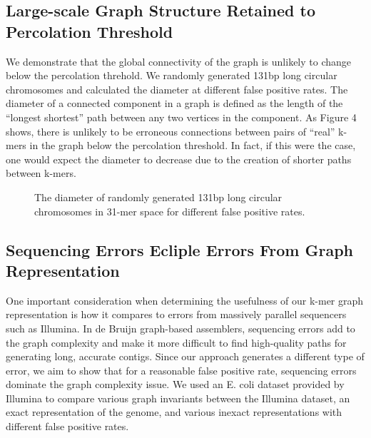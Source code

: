 \documentclass[12pt]{article} \usepackage{simplemargins}
\begin{document}
\subsection{Large-scale Graph Structure Retained to Percolation Threshold}
We demonstrate that the global connectivity of the graph is unlikely 
to change below the percolation threhold. We randomly generated 131bp long circular 
chromosomes and calculated the diameter at different false positive rates. The diameter 
of a connected component in a graph is defined as the length of the ``longest shortest'' 
path between any two vertices in the component. As Figure 4 shows, there is unlikely to 
be erroneous connections between pairs of ``real'' k-mers in the graph below the 
percolation threshold. In fact, if this were the case, one would expect the diameter 
to decrease due to the creation of shorter paths between k-mers.

\begin{figure}
\caption{The diameter of randomly generated 131bp long circular chromosomes in 31-mer 
space for different false positive rates.}
\end{figure}

\subsection{Sequencing Errors Ecliple Errors From Graph Representation}
One important consideration when determining the usefulness of our k-mer
graph representation is how it compares to errors from massively
parallel sequencers such as Illumina. In de Bruijn graph-based
assemblers, sequencing errors add to the graph complexity and make it
more difficult to find high-quality paths for generating long,
accurate contigs. Since our approach generates
a different type of error, we aim to show that for a reasonable false
positive rate, sequencing errors dominate the graph complexity
issue. We used an E. coli dataset provided by Illumina to compare
various graph invariants between the Illumina dataset, an exact
representation of the genome, and various inexact representations with
different false positive rates.
\end{document}

